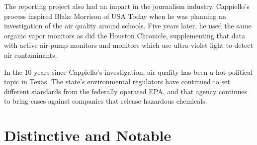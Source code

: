 The reporting project also had an impact in the journalism industry. Cappiello's
process inspired Blake Morrison of USA Today when he was planning
an investigation of the air quality around schools. Five years later, he used
the same organic vapor monitors as did the Houston Chronicle, supplementing
that data with active air-pump monitors and monitors which use
ultra-violet light to detect air contaminants.

In the 10 years since Cappiello's investigation, air quality has been a hot
political topic in Texas. The state's environmental regulators have continued
to set different standards from the federally operated EPA, and
that agency continues to bring cases against companies that release
hazardous chemicals.

\section{Distinctive and Notable}
